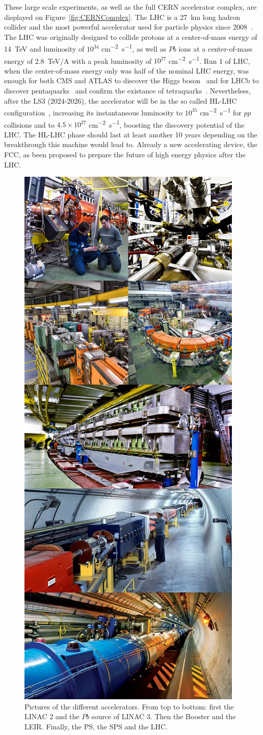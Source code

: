 	These large scale experiments, as well as the full CERN accelerator complex, are displayed on Figure~\ref{fig:CERNComplex}. The LHC is a \SI{27}{km} long hadron collider and the most powerful accelerator used for particle physics since 2008~\cite{LHC2008}. The LHC was originally designed to collide protons at a center-of-mass energy of \SI{14}{TeV} and luminosity of $10^{34}$ \si{cm^{-2}s^{-1}}, as well as $Pb$ ions at a center-of-mass energy of \SI{2.8}{TeV/A} with a peak luminosity of $10^{27}$ \si{cm^{-2}s^{-1}}. Run 1 of LHC, when the center-of-mass energy only was half of the nominal LHC energy, was enough for both CMS and ATLAS to discover the Higgs boson~\cite{HIGGS2015} and for LHCb to discover pentaquarks~\cite{PENTAQUARK2015} and confirm the existance of tetraquarks~\cite{TETRAQUARK2017}. Nevertheless, after the \acf{LS3} (2024-2026), the accelerator will be in the so called \acl{HL-LHC} configuration~\cite{HLLHC2017}, increasing its instantaneous luminosity to $10^{35}$ \si{cm^{-2}s^{-1}} for $pp$ collisions and to $4.5\times 10^{27}$ \si{cm^{-2}s^{-1}}, boosting the discovery potential of the LHC. The HL-LHC phase should last at least another 10 years depending on the breakthrough this machine would lead to. Already a new accelerating device, the FCC, as been proposed to prepare the future of high energy physics after the LHC.

	\begin{figure}[H]
		\centering
		\includegraphics[width=0.45\linewidth]{fig/chapt2/CERN-accelerators.jpg}
		\caption{\label{fig:CERNAccelerators} Pictures of the different accelerators. From top to bottom: first the LINAC 2 and the $Pb$ source of LINAC 3. Then the Booster and the LEIR. Finally, the PS, the SPS and the LHC.}
	\end{figure}
	
